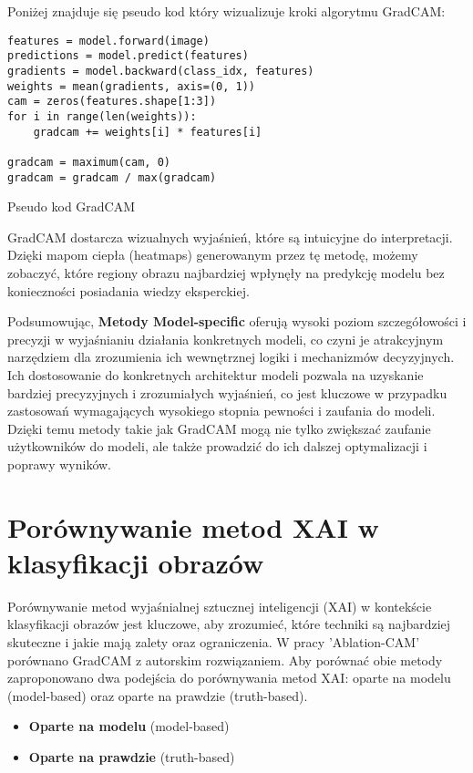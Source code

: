 Poniżej znajduje się pseudo kod który wizualizuje kroki algorytmu GradCAM:

\begin{listing}
	\begin{verbatim}
features = model.forward(image)
predictions = model.predict(features)
gradients = model.backward(class_idx, features)
weights = mean(gradients, axis=(0, 1))
cam = zeros(features.shape[1:3])
for i in range(len(weights)):
    gradcam += weights[i] * features[i]

gradcam = maximum(cam, 0)
gradcam = gradcam / max(gradcam)
    \end{verbatim}
	\caption{Pseudo kod GradCAM} \label{listing:gradcam}
\end{listing}

GradCAM dostarcza  wizualnych wyjaśnień, które są intuicyjne do interpretacji.
Dzięki mapom ciepła (heatmaps) generowanym przez tę metodę, możemy zobaczyć, które regiony obrazu najbardziej wpłynęły na predykcję modelu bez konieczności posiadania wiedzy eksperckiej.

\vspace{1cm}

Podsumowując, \textbf{Metody Model-specific} oferują wysoki poziom szczegółowości i precyzji w wyjaśnianiu działania konkretnych modeli, co czyni je atrakcyjnym narzędziem dla zrozumienia ich wewnętrznej logiki i mechanizmów decyzyjnych.
Ich dostosowanie do konkretnych architektur modeli pozwala na uzyskanie bardziej precyzyjnych i zrozumiałych wyjaśnień, co jest kluczowe w przypadku zastosowań wymagających wysokiego stopnia pewności i zaufania do modeli.
Dzięki temu metody takie jak GradCAM mogą nie tylko zwiększać zaufanie użytkowników do modeli, ale także prowadzić do ich dalszej optymalizacji i poprawy wyników.

\section*{Porównywanie metod XAI w klasyfikacji obrazów}
Porównywanie metod wyjaśnialnej sztucznej inteligencji (XAI) w kontekście klasyfikacji obrazów jest kluczowe, aby zrozumieć, które techniki są najbardziej skuteczne i jakie mają zalety oraz ograniczenia.
W pracy 'Ablation-CAM'\cite{9093360} porównano GradCAM z autorskim rozwiązaniem.
Aby porównać obie metody zaproponowano dwa podejścia do porównywania metod XAI: oparte na modelu (model-based) oraz oparte na prawdzie (truth-based).
\begin{itemize}
	\item \textbf{Oparte na modelu} (model-based)
	\item \textbf{Oparte na prawdzie} (truth-based)
\end{itemize}

